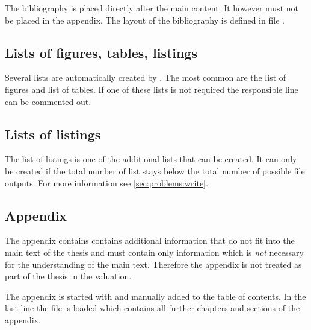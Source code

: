 The bibliography is placed directly after the main content. It however must 
not be placed in the appendix. The layout of the bibliography is defined in 
file .
%

\subsection{Lists of figures, tables, listings}
\label{sec:document:lists}

Several lists are automatically created by \latex. The most common are the list of figures and list of tables. If one of these lists is not required the responsible line can be commented out. 
%

\subsection{Lists of listings}
\label{sec:document:listings}

The list of listings is one of the additional lists that can be created. 
It can only be created if the total number of list stays below the total number of possible file outputs. For more information see \cref{sec:problems:write}.


\subsection{Appendix}
\label{sec:document:appendix}

The appendix contains contains additional information that do not fit into the main text of the thesis and must contain only information which is \emph{not} necessary for the understanding of the main text. Therefore the appendix is not treated as part of the thesis in the valuation.

The appendix is started with  and manually added to the table of contents. In the last line the file  is loaded which contains all further chapters and sections of the appendix.
%


